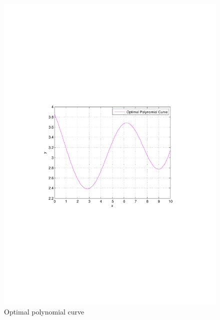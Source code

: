 \documentclass[letterpaper,12pt]{article}
\numberwithin{equation}{section}
\begin{document}
\begin{figure}[H]
\vspace{-5cm}
 
\centering
      \includegraphics[scale=0.8]{3}
\vspace{-8.3cm}
\caption{\label{fig:optimal curve} 
Optimal polynomial curve}
       
\end{figure}
\end{document}
